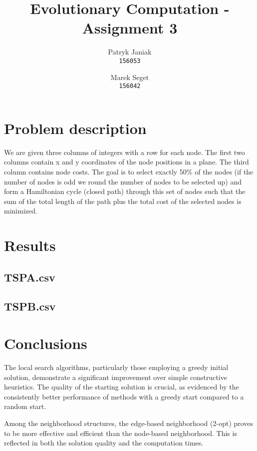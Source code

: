 \documentclass{article}
\title{Evolutionary Computation - Assignment 3}
\author{
  Patryk Janiak\\
  \texttt{156053}
  \and
  Marek Seget\\
  \texttt{156042}
}
\begin{document}
\maketitle

\section{Problem description}
We are given three columns of integers with a row for each node. The first two columns contain x
and y coordinates of the node positions in a plane. The third column contains node costs. The goal is
to select exactly 50\% of the nodes (if the number of nodes is odd we round the number of nodes to
be selected up) and form a Hamiltonian cycle (closed path) through this set of nodes such that the
sum of the total length of the path plus the total cost of the selected nodes is minimized.



\section{Results}





\subsection{TSPA.csv}



\subsection{TSPB.csv}



\newpage

\section{Conclusions}

The local search algorithms, particularly those employing a greedy initial solution, demonstrate a significant improvement over simple constructive heuristics. The quality of the starting solution is crucial, as evidenced by the consistently better performance of methods with a greedy start compared to a random start.

Among the neighborhood structures, the edge-based neighborhood (2-opt) proves to be more effective and efficient than the node-based neighborhood. This is reflected in both the solution quality and the computation times.
\end{document}
